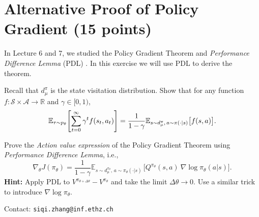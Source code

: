 \section{Alternative Proof of Policy Gradient (15 points)}
In Lecture 6 and 7, we studied the Policy Gradient Theorem and \textit{Performance Difference Lemma} (PDL) \cite{kakade2002approximately}. In this exercise we will use PDL to derive the theorem.
\begin{questions}

\question[5]
Recall that $d_{\mu}^{\pi}$ is the state visitation distribution. Show that for any function $f:\mathcal{S}\times\mathcal{A}\rightarrow\mathbb{R}$ and $\gamma\in[0,1)$,
\begin{equation*}
    \mathbb{E}_{\tau\sim p_\theta}{\left[\sum_{t=0}^\infty\gamma^t f(s_t, a_t)\right]}
    =
    \frac{1}{1-\gamma}\mathbb{E}_{s\sim d_{\mu}^{\pi},\,a\sim\pi(\cdot | s)}\big[f(s,a)\big].
\end{equation*}

\question[10]
Prove the \textit{Action value expression} of the Policy Gradient Theorem using \textit{Performance Difference Lemma}, i.e.,
\begin{equation}
    \nabla_\theta J(\pi_\theta)
    =
    \frac{1}{1-\gamma}\mathbb{E}_{s\sim d_{\mu}^{\pi_\theta},\, a\sim\pi_\theta(\cdot|s)}\,\big[
        Q^{\pi_{\theta}}(s,a)\ \nabla\log\pi_\theta(a | s)\big].
\end{equation}
\vspace{1em}
\textbf{Hint:} Apply PDL to $V^{\pi_{\theta+\Delta\theta}}-V^{\pi_\theta}$ and take the limit $\Delta\theta\rightarrow 0$. Use a similar trick to introduce $\nabla\log\pi_\theta$.
\end{questions}

Contact: \texttt{siqi.zhang@inf.ethz.ch}

